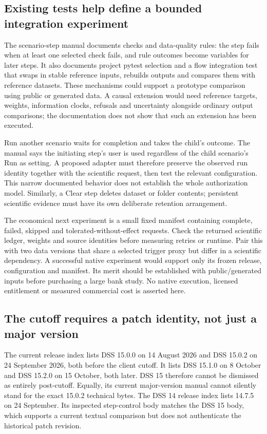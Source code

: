 \subsection{Existing tests help define a bounded integration experiment}

The scenario-step manual documents checks and data-quality rules: the step
fails when at least one selected check fails, and rule outcomes become
variables for later steps. It also documents project pytest selection and a
flow integration test that swaps in stable reference inputs, rebuilds outputs
and compares them with reference datasets. These mechanisms could support a
prototype comparison using public or generated data. A causal extension would
need reference targets, weights, information clocks, refusals and uncertainty
alongside ordinary output comparisons; the documentation does not show that
such an extension has been executed.
\citep{exec23_dss_latest_steps}

Run another scenario waits for completion and takes the child's outcome.
The manual says the initiating step's user is used regardless of the child
scenario's Run as setting. A proposed adapter must therefore preserve the
observed run identity together with the scientific request, then test the
relevant configuration. This narrow documented behavior does not establish
the whole authorization model. Similarly, a Clear step deletes dataset or
folder contents; persistent scientific evidence must have its own deliberate
retention arrangement.~\citep{exec23_dss_latest_steps}

The economical next experiment is a small fixed manifest containing complete,
failed, skipped and tolerated-without-effect requests. Check the returned
scientific ledger, weights and source identities before measuring retries or
runtime. Pair this with two data versions that share a selected trigger proxy
but differ in a scientific dependency. A successful native experiment would
support only its frozen release, configuration and manifest. Its merit should
be established with public/generated inputs before purchasing a large bank
study. No native execution, licensed entitlement or measured commercial cost
is asserted here.

\subsection{The cutoff requires a patch identity, not just a major version}
\label{exec23:dss-cutoff}

The current release index lists DSS 15.0.0 on 14 August 2026 and DSS 15.0.2 on
24 September 2026, both before the client cutoff. It lists DSS 15.1.0 on
8 October and DSS 15.2.0 on 15 October, both later. DSS 15 therefore cannot be
dismissed as entirely post-cutoff. Equally, its current major-version manual
cannot silently stand for the exact 15.0.2 technical bytes. The DSS 14 release
index lists 14.7.5 on 24 September. Its inspected step-control body matches
the DSS 15 body, which supports a current textual comparison but does not
authenticate the historical patch revision.
\citep{exec23_dss_latest_releases,exec23_dss_dss14_releases,
exec23_dss_latest_flow,exec23_dss_dss14_flow}

